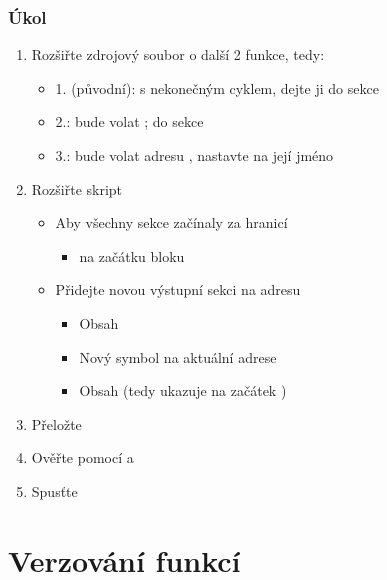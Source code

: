 \begin{frame}
  \frametitle{Úkol}

  \begin{enumerate}
    \item Rozšiřte zdrojový soubor o další 2 funkce, tedy:
    \begin{itemize}
      \item 1. (původní): s nekonečným cyklem, dejte ji do sekce 
      \item 2.: bude volat ; do sekce
      \item 3.: bude volat adresu , nastavte  na
        její jméno
    \end{itemize}
    \item Rozšiřte skript
    \begin{itemize}
      \item Aby všechny sekce začínaly za hranicí 
      \begin{itemize}
	\item {} na začátku bloku 
      \end{itemize}
      \item Přidejte novou výstupní sekci  na adresu 
      \begin{itemize}
	\item Obsah 
	\item Nový symbol  na aktuální adrese
	\item Obsah  (tedy  ukazuje na začátek )
      \end{itemize}
    \end{itemize}
    \item Přeložte
    \item Ověřte pomocí  a 
    \item Spusťte
  \end{enumerate}

\end{frame}

\section{Verzování funkcí}
\frame{\sectionpage}

